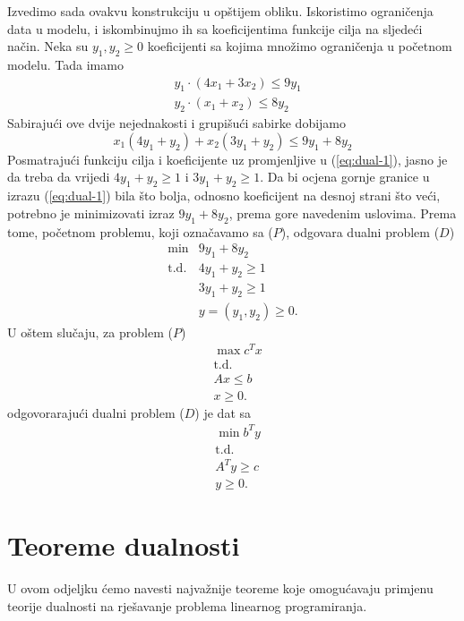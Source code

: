 \documentclass[a4paper, utf8, 11pt, colorlinks]{book}
\theoremstyle{definition}
\begin{document}
Izvedimo sada ovakvu konstrukciju u opštijem obliku. Iskoristimo ograničenja data u modelu, i iskombinujmo ih sa koeficijentima funkcije cilja na sljedeći način. Neka su $y_1, y_2 \geq 0$ koeficijenti sa kojima množimo ograničenja u početnom modelu. Tada imamo 
\begin{align*}
    &y_1 \cdot (4x_1 + 3x_2) \leq 9 y_1 \\
    &y_2 \cdot (x_1 + x_2 ) \leq 8 y_2 
\end{align*}
Sabirajući ove dvije nejednakosti i grupišući sabirke dobijamo 
\begin{equation}\label{eq:dual-1}
     x_1 ( 4 y_1 + y_2 ) + x_2 ( 3 y_1 + y_2 ) \leq 9 y_1 + 8 y_2 
\end{equation}
Posmatrajući funkciju cilja i koeficijente uz promjenljive u (\ref{eq:dual-1}), jasno je da treba da vrijedi 
$4 y_1 + y_2 \geq 1$ i $3 y_1 + y_2 \geq 1$. Da bi ocjena gornje granice u izrazu  (\ref{eq:dual-1}) bila što bolja, odnosno koeficijent na desnoj strani što veći, potrebno je minimizovati izraz $9y_1 + 8 y_2$, prema gore navedenim uslovima. Prema tome, početnom problemu, koji označavamo sa ($P$), odgovara dualni problem ($D$)
$$\begin{array}{ll}
     \min                    &  9 y_1+ 8 y_2        \\
       \mbox{t.d.}   &  4 y_1     +   y_2 \geq 1   \\
                             &  3 y_1 + y_2 \geq 1 \\
                  &            y=(y_1,y_2) \geq 0.
\end{array}$$
U oštem slučaju,  za problem ($P$) %
\begin{align*}
	& \max c^T x  \\
	& \mbox{t.d.} \nonumber \\
	& A x \leq b \\
	& x \geq 0.
\end{align*}
odgovorarajući dualni problem ($D$)  je dat sa 
\begin{align*}
     & \min b^T y  \\
     & \mbox{t.d.} \nonumber \\
     & A^T y \geq c \\
     & y \geq 0.
\end{align*}

\section{Teoreme dualnosti}
U ovom odjeljku ćemo navesti najvažnije teoreme koje omogućavaju primjenu teorije dualnosti na rješavanje problema linearnog programiranja.
\end{document}
